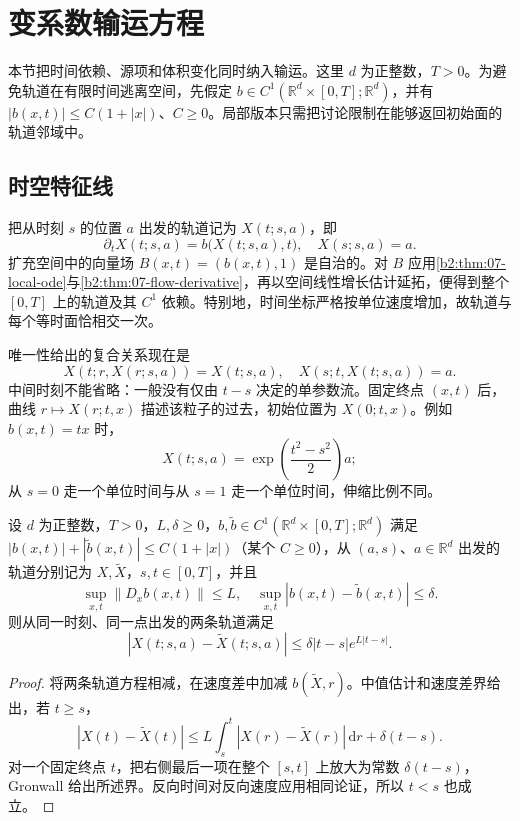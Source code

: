 \section{变系数输运方程}
\label{b2:sec:0703}

本节把时间依赖、源项和体积变化同时纳入输运。这里 \(d\) 为正整数，\(T>0\)。为避免轨道在有限时间逃离空间，先假定 \(b\in C^1(\mathbb R^d\times[0,T];\mathbb R^d)\)，并有 \(|b(x,t)|\leq C(1+|x|)\)、\(C\geq0\)。局部版本只需把讨论限制在能够返回初始面的轨道邻域中。

\subsection{时空特征线}
\label{b2:subsec:070301}

把从时刻 \(s\) 的位置 \(a\) 出发的轨道记为 \(X(t;s,a)\)，即
\[
 \partial_tX(t;s,a)=b\bigl(X(t;s,a),t\bigr),\quad X(s;s,a)=a.
\]
扩充空间中的向量场 \(B(x,t)=(b(x,t),1)\) 是自治的。对 \(B\) 应用\cref{b2:thm:07-local-ode}与\cref{b2:thm:07-flow-derivative}，再以空间线性增长估计延拓，便得到整个 \([0,T]\) 上的轨道及其 \(C^1\) 依赖。特别地，时间坐标严格按单位速度增加，故轨道与每个等时面恰相交一次。

\ProseParagraphBreak

唯一性给出的复合关系现在是
\[
 X(t;r,X(r;s,a))=X(t;s,a),\quad
 X(s;t,X(t;s,a))=a.
\]
中间时刻不能省略：一般没有仅由 \(t-s\) 决定的单参数流。固定终点 \((x,t)\) 后，曲线 \(r\mapsto X(r;t,x)\) 描述该粒子的过去，初始位置为 \(X(0;t,x)\)。例如 \(b(x,t)=t x\) 时，
\[
 X(t;s,a)=\exp\left(\frac{t^2-s^2}{2}\right)a;
\]
从 \(s=0\) 走一个单位时间与从 \(s=1\) 走一个单位时间，伸缩比例不同。

\begin{proposition}[速度扰动的轨道估计]\label{b2:prop:07-speed-stability}
设 \(d\) 为正整数，\(T>0\)，\(L,\delta\geq0\)，\(b,\widetilde b\in C^1(\mathbb R^d\times[0,T];\mathbb R^d)\) 满足 \(|b(x,t)|+|\widetilde b(x,t)|\leq C(1+|x|)\)（某个 \(C\geq0\)），从 \((a,s)\)、\(a\in\mathbb R^d\) 出发的轨道分别记为 \(X,\widetilde X\)，\(s,t\in[0,T]\)，并且
\[
 \sup_{x,t}\|D_xb(x,t)\|\leq L,
 \quad\sup_{x,t}|b(x,t)-\widetilde b(x,t)|\leq\delta.
\]
则从同一时刻、同一点出发的两条轨道满足
\[
 |X(t;s,a)-\widetilde X(t;s,a)|
 \leq\delta|t-s|e^{L|t-s|}.
\]
\end{proposition}
\begin{proof}
将两条轨道方程相减，在速度差中加减 \(b(\widetilde X,r)\)。中值估计和速度差界给出，若 \(t\geq s\)，
\[
 |X(t)-\widetilde X(t)|
 \leq L\int_s^t|X(r)-\widetilde X(r)|\,\mathrm{d}r+\delta(t-s).
\]
对一个固定终点 \(t\)，把右侧最后一项在整个 \([s,t]\) 上放大为常数 \(\delta(t-s)\)，Gronwall 给出所述界。反向时间对反向速度应用相同论证，所以 \(t<s\) 也成立。
\end{proof}

